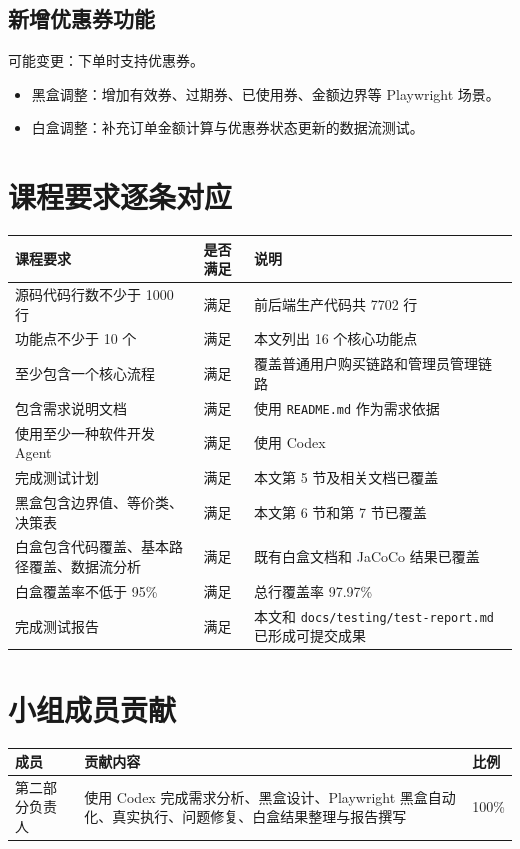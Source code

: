 \documentclass[UTF8,a4paper,12pt]{ctexart}
\begin{document}
\subsection{新增优惠券功能}

可能变更：下单时支持优惠券。

\begin{itemize}
  \item 黑盒调整：增加有效券、过期券、已使用券、金额边界等 Playwright 场景。
  \item 白盒调整：补充订单金额计算与优惠券状态更新的数据流测试。
\end{itemize}

\section{课程要求逐条对应}

\begin{longtable}{p{6cm}p{3cm}p{6cm}}
\toprule
课程要求 & 是否满足 & 说明 \\
\midrule
源码代码行数不少于 1000 行 & 满足 & 前后端生产代码共 7702 行 \\
功能点不少于 10 个 & 满足 & 本文列出 16 个核心功能点 \\
至少包含一个核心流程 & 满足 & 覆盖普通用户购买链路和管理员管理链路 \\
包含需求说明文档 & 满足 & 使用 \texttt{README.md} 作为需求依据 \\
使用至少一种软件开发 Agent & 满足 & 使用 Codex \\
完成测试计划 & 满足 & 本文第 5 节及相关文档已覆盖 \\
黑盒包含边界值、等价类、决策表 & 满足 & 本文第 6 节和第 7 节已覆盖 \\
白盒包含代码覆盖、基本路径覆盖、数据流分析 & 满足 & 既有白盒文档和 JaCoCo 结果已覆盖 \\
白盒覆盖率不低于 95\% & 满足 & 总行覆盖率 97.97\% \\
完成测试报告 & 满足 & 本文和 \texttt{docs/testing/test-report.md} 已形成可提交成果 \\
\bottomrule
\end{longtable}

\section{小组成员贡献}

\begin{longtable}{p{4cm}p{8cm}p{3cm}}
\toprule
成员 & 贡献内容 & 比例 \\
\midrule
第二部分负责人 & 使用 Codex 完成需求分析、黑盒设计、Playwright 黑盒自动化、真实执行、问题修复、白盒结果整理与报告撰写 & 100\% \\
\bottomrule
\end{longtable}
\end{document}
